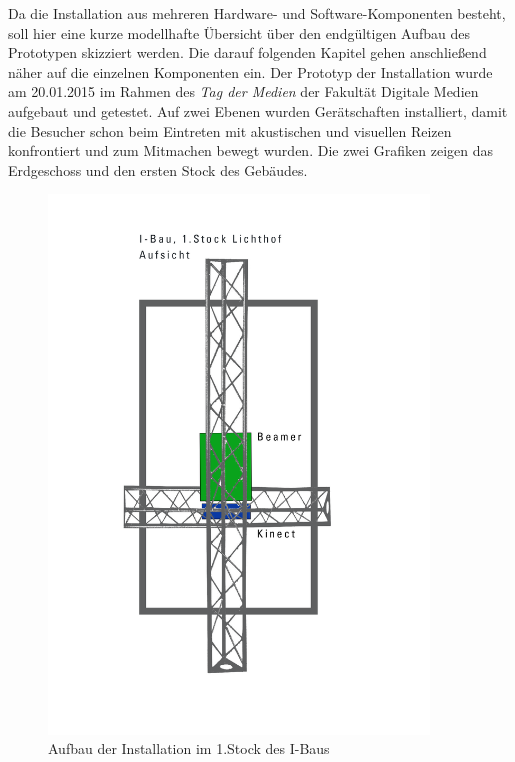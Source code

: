 Da die Installation aus mehreren Hardware- und Software-Komponenten besteht, soll hier eine kurze modellhafte Übersicht über den endgültigen Aufbau des Prototypen skizziert werden. Die darauf folgenden Kapitel gehen anschließend näher auf die einzelnen Komponenten ein. Der Prototyp der Installation wurde am 20.01.2015 im Rahmen des \textit{Tag der Medien} der Fakultät Digitale Medien aufgebaut und getestet. Auf zwei Ebenen wurden Gerätschaften installiert, damit die Besucher schon beim Eintreten mit akustischen und visuellen Reizen konfrontiert und zum Mitmachen bewegt wurden. Die zwei Grafiken zeigen das Erdgeschoss und den ersten Stock des Gebäudes.
\begin{figure}[h]
	\centering
		\includegraphics[width=0.90\textwidth]{images/ModelFirstFloor.png}
	\caption{Aufbau der Installation im 1.Stock des I-Baus}
	\label{fig:ModelFF}
\end{figure}

